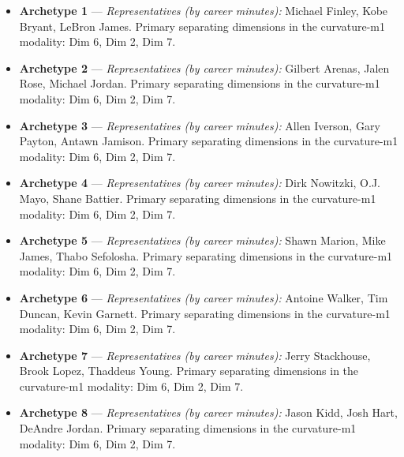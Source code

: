 \begin{itemize}
\item \textbf{Archetype 1} --- \emph{Representatives (by career minutes):} Michael Finley, Kobe Bryant, LeBron James. Primary separating dimensions in the curvature-m1 modality: Dim 6, Dim 2, Dim 7.
\item \textbf{Archetype 2} --- \emph{Representatives (by career minutes):} Gilbert Arenas, Jalen Rose, Michael Jordan. Primary separating dimensions in the curvature-m1 modality: Dim 6, Dim 2, Dim 7.
\item \textbf{Archetype 3} --- \emph{Representatives (by career minutes):} Allen Iverson, Gary Payton, Antawn Jamison. Primary separating dimensions in the curvature-m1 modality: Dim 6, Dim 2, Dim 7.
\item \textbf{Archetype 4} --- \emph{Representatives (by career minutes):} Dirk Nowitzki, O.J. Mayo, Shane Battier. Primary separating dimensions in the curvature-m1 modality: Dim 6, Dim 2, Dim 7.
\item \textbf{Archetype 5} --- \emph{Representatives (by career minutes):} Shawn Marion, Mike James, Thabo Sefolosha. Primary separating dimensions in the curvature-m1 modality: Dim 6, Dim 2, Dim 7.
\item \textbf{Archetype 6} --- \emph{Representatives (by career minutes):} Antoine Walker, Tim Duncan, Kevin Garnett. Primary separating dimensions in the curvature-m1 modality: Dim 6, Dim 2, Dim 7.
\item \textbf{Archetype 7} --- \emph{Representatives (by career minutes):} Jerry Stackhouse, Brook Lopez, Thaddeus Young. Primary separating dimensions in the curvature-m1 modality: Dim 6, Dim 2, Dim 7.
\item \textbf{Archetype 8} --- \emph{Representatives (by career minutes):} Jason Kidd, Josh Hart, DeAndre Jordan. Primary separating dimensions in the curvature-m1 modality: Dim 6, Dim 2, Dim 7.
\end{itemize}
